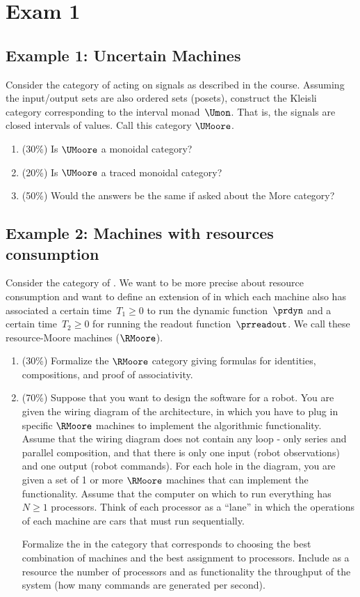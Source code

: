 \section{Exam 1}
\subsection{Example 1: Uncertain Machines}

Consider the category of  acting on signals as described in the course.
Assuming the input/output sets are also ordered sets (posets), construct the Kleisli category corresponding to the interval monad~$\Umon$.
That is, the signals are closed intervals of values.
Call this category $\UMoore$.
\begin{enumerate}
    \item (30\%) Is $\UMoore$ a monoidal category?
    \item (20\%) Is $\UMoore$ a traced monoidal category?
    \item (50\%) Would the answers be the same if asked about the More category?
\end{enumerate}

\subsection{Example 2: Machines with resources consumption}
Consider the category of .
We want to be more precise about resource consumption and want to define an extension of  in which each machine also has associated a certain time~$T_1\geq 0$ to run the dynamic function~$\prdyn$ and a certain time~$T_2\geq 0$ for running the readout function~$\prreadout$.
We call these resource-Moore machines ($\RMoore$).

\begin{enumerate}
    \item (30\%) Formalize the $\RMoore$ category giving formulas for identities, compositions, and proof of associativity.
    \item (70\%) Suppose that you want to design the software for a robot.
          You are given the wiring diagram of the architecture, in which you have to plug in specific $\RMoore$ machines to implement the algorithmic functionality.
          Assume that the wiring diagram does not contain any loop - only series and parallel composition, and that there is only one input (robot observations) and one output (robot commands).
          For each hole in the diagram, you are given a set of 1 or more $\RMoore$ machines that can implement the functionality.
          Assume that the computer on which to run everything has~$N\geq 1$ processors.
          Think of each processor as a ``lane'' in which the operations of each machine are cars that must run sequentially.

          Formalize the  in the category \DPI that corresponds to choosing the best combination of machines and the best assignment to processors.
          Include as a resource the number of processors and as functionality the throughput of the system (how many commands are generated per second).
\end{enumerate}

